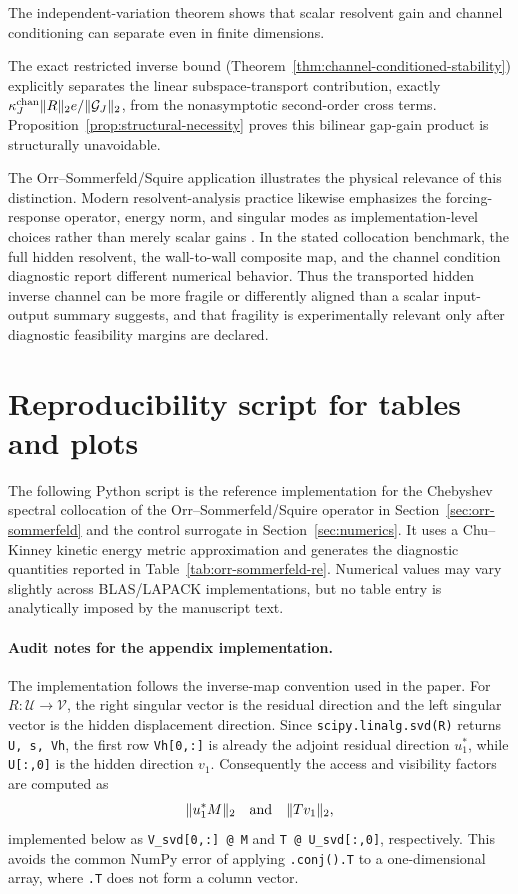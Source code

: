 \documentclass[review]{siamart220329}
\theoremstyle{definition}
\theoremstyle{remark}
\newcommand{\calU}{\mathcal{U}}
\newcommand{\calV}{\mathcal{V}}
\begin{document}
The independent-variation theorem shows that scalar resolvent gain and channel conditioning can separate even in finite dimensions.

The exact restricted inverse bound (Theorem~\ref{thm:channel-conditioned-stability}) explicitly separates the linear subspace-transport contribution, exactly $\kappa_J^{\rm chan} \|R\|_2 e / \| \mathcal{G}_J \|_2$, from the nonasymptotic second-order cross terms. Proposition~\ref{prop:structural-necessity} proves this bilinear gap-gain product is structurally unavoidable. 

The Orr--Sommerfeld/Squire application illustrates the physical relevance of this distinction. Modern resolvent-analysis practice likewise emphasizes the forcing-response operator, energy norm, and singular modes as implementation-level choices rather than merely scalar gains \cite{RolandiRibeiroYehTaira2024}. In the stated collocation benchmark, the full hidden resolvent, the wall-to-wall composite map, and the channel condition diagnostic report different numerical behavior. Thus the transported hidden inverse channel can be more fragile or differently aligned than a scalar input-output summary suggests, and that fragility is experimentally relevant only after diagnostic feasibility margins are declared.

\appendix
\section{Reproducibility script for tables and plots}\label{app:reproducibility}
The following Python script is the reference implementation for the Chebyshev spectral collocation of the Orr--Sommerfeld/Squire operator in Section~\ref{sec:orr-sommerfeld} and the control surrogate in Section~\ref{sec:numerics}. It uses a Chu--Kinney kinetic energy metric approximation and generates the diagnostic quantities reported in Table~\ref{tab:orr-sommerfeld-re}. Numerical values may vary slightly across BLAS/LAPACK implementations, but no table entry is analytically imposed by the manuscript text. 


\paragraph{Audit notes for the appendix implementation.}
The implementation follows the inverse-map convention used in the paper. For
$R:\calU\to\calV$, the right singular vector is the residual direction and the
left singular vector is the hidden displacement direction. Since
\texttt{scipy.linalg.svd(R)} returns \texttt{U, s, Vh}, the first row
\texttt{Vh[0,:]} is already the adjoint residual direction $u_1^*$, while
\texttt{U[:,0]} is the hidden direction $v_1$. Consequently the access and
visibility factors are computed as
\begin{equation}
    \|u_1^*M\|_2
    \quad\hbox{and}\quad
    \|Tv_1\|_2,
\end{equation}
implemented below as \texttt{V\_svd[0,:] @ M} and
\texttt{T @ U\_svd[:,0]}, respectively. This avoids the common NumPy error of
applying \texttt{.conj().T} to a one-dimensional array, where \texttt{.T} does
not form a column vector.
\end{document}
